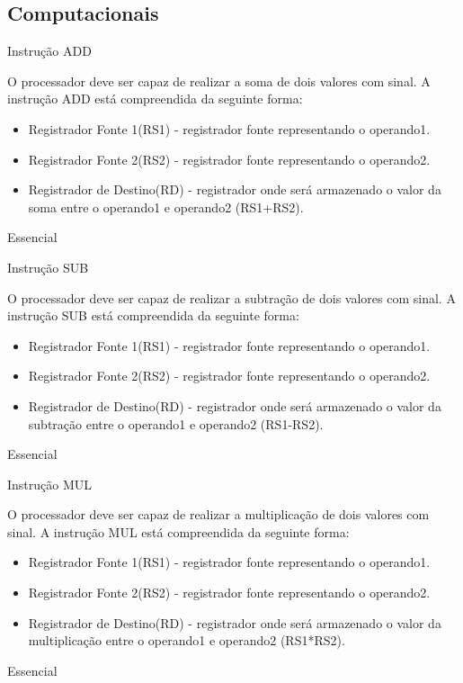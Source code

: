 \documentclass{article}
\begin{document}
    \subsection{Computacionais}
    \begin{functional}

     \requirement
      {Instrução ADD}
      {O processador deve ser capaz de realizar a soma de dois valores com sinal.
      A instrução ADD está compreendida da seguinte forma:
       \begin{itemize}
        \item Registrador Fonte 1(RS1) - registrador fonte representando o operando1.
        \item Registrador Fonte 2(RS2) - registrador fonte representando o operando2.
        \item Registrador de Destino(RD) - registrador onde será armazenado o valor da soma entre o operando1 e operando2 (RS1+RS2).
       \end{itemize}}
      {Essencial}

     \requirement
      {Instrução SUB}
      {O processador deve ser capaz de realizar a subtração de dois valores com sinal.
      A instrução SUB está compreendida da seguinte forma:
       \begin{itemize}
        \item Registrador Fonte 1(RS1) - registrador fonte representando o operando1.
        \item Registrador Fonte 2(RS2) - registrador fonte representando o operando2.
        \item Registrador de Destino(RD) - registrador onde será armazenado o valor da subtração entre o operando1 e operando2 (RS1-RS2).
       \end{itemize}}
      {Essencial}

      \requirement
      {Instrução MUL}
      {O processador deve ser capaz de realizar a multiplicação de dois valores com sinal.
      A instrução MUL está compreendida da seguinte forma:
       \begin{itemize}
        \item Registrador Fonte 1(RS1) - registrador fonte representando o operando1.
        \item Registrador Fonte 2(RS2) - registrador fonte representando o operando2.
        \item Registrador de Destino(RD) - registrador onde será armazenado o valor da multiplicação entre o operando1 e operando2 (RS1*RS2).
       \end{itemize}}
      {Essencial}


\end{functional}
\end{document}
